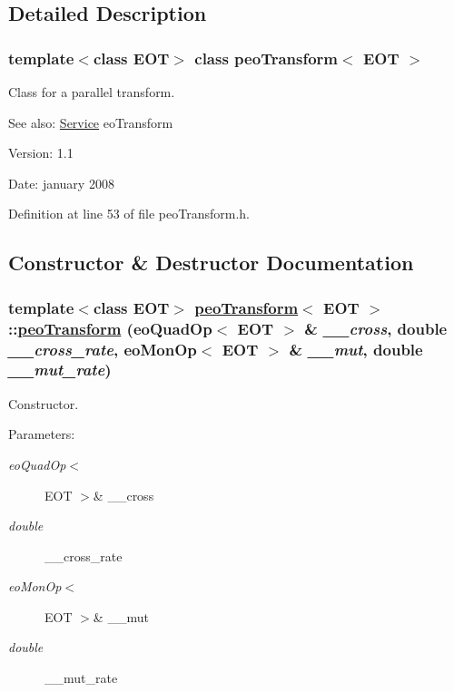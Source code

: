 \subsection{Detailed Description}
\subsubsection*{template$<$class EOT$>$ class peo\-Transform$<$ EOT $>$}

Class for a parallel transform. 

\begin{Desc}
\item[See also:]\hyperlink{classService}{Service} eo\-Transform \end{Desc}
\begin{Desc}
\item[Version:]1.1 \end{Desc}
\begin{Desc}
\item[Date:]january 2008 \end{Desc}




Definition at line 53 of file peo\-Transform.h.

\subsection{Constructor \& Destructor Documentation}
\hypertarget{classpeoTransform_755989a2d080903d0cade75643de0788}{
\subsubsection[peoTransform]{\setlength{\rightskip}{0pt plus 5cm}template$<$class EOT$>$ \hyperlink{classpeoTransform}{peo\-Transform}$<$ EOT $>$::\hyperlink{classpeoTransform}{peo\-Transform} (eo\-Quad\-Op$<$ EOT $>$ \& {\em \_\-\_\-cross}, double {\em \_\-\_\-cross\_\-rate}, eo\-Mon\-Op$<$ EOT $>$ \& {\em \_\-\_\-mut}, double {\em \_\-\_\-mut\_\-rate})}}
\label{classpeoTransform_755989a2d080903d0cade75643de0788}


Constructor. 

\begin{Desc}
\item[Parameters:]
\begin{description}
\item[{\em eo\-Quad\-Op$<$}]EOT $>$\& \_\-\_\-cross \item[{\em double}]\_\-\_\-cross\_\-rate \item[{\em eo\-Mon\-Op$<$}]EOT $>$\& \_\-\_\-mut \item[{\em double}]\_\-\_\-mut\_\-rate \end{description}
\end{Desc}


